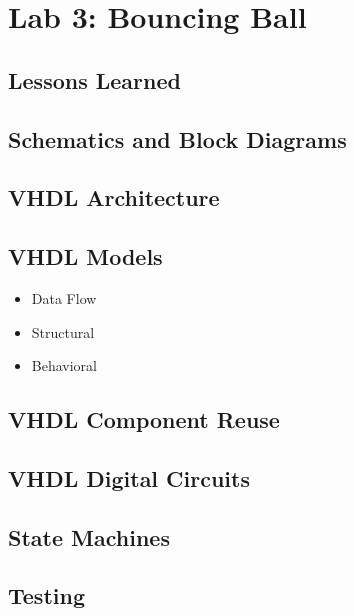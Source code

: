 \chapter{Lab 3: Bouncing Ball \\
\label{Introduction}}


\section{Lessons Learned
\label{Section::Lessons Learned}}
 \section{Schematics and Block Diagrams}
 \section{VHDL Architecture}
 \section{VHDL Models}
 \begin{itemize}
     \item Data Flow
     \item Structural
     \item Behavioral
\end{itemize}
 \section{VHDL Component Reuse}
 \section{VHDL Digital Circuits}
 \section{State Machines}
 \section{Testing}
